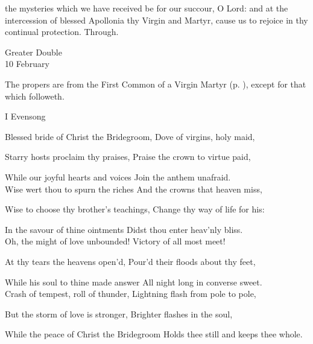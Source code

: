 \postcommunion
{} the mysteries which we have received be for our succour, O Lord: and at the intercession of blessed Apollonia thy Virgin and Martyr, cause us to rejoice in thy continual protection. Through.


\begin{inhead}
    {Greater Double\\
10 February}
\end{inhead}

\begin{rubric}
	The propers are from the First Common of a Virgin Martyr (p. \pageref{CommonVirginMartyrI}), except for that which followeth.
\end{rubric}

\begin{paracol}{2}[]
\sloppy
\begin{inhead}
	I Evensong
\end{inhead}
\begin{hangparas}{1.25em}{1}

Blessed bride of Christ the Bridegroom, Dove of virgins, holy maid,

Starry hosts proclaim thy praises, Praise the crown to virtue paid,

While our joyful hearts and voices Join the anthem unafraid.\\

Wise wert thou to spurn the riches And the crowns that heaven miss,

Wise to choose thy brother's teachings, Change thy way of life for his:

In the savour of thine ointments Didst thou enter heav'nly bliss.\\

Oh, the might of love unbounded! Victory of all most meet!

At thy tears the heavens open'd, Pour'd their floods about thy feet,

While his soul to thine made answer All night long in converse sweet.\\

Crash of tempest, roll of thunder, Lightning flash from pole to pole,

But the storm of love is stronger, Brighter flashes in the soul,

While the peace of Christ the Bridegroom Holds thee still and keeps thee whole.\\


\end{hangparas}
\end{paracol}

